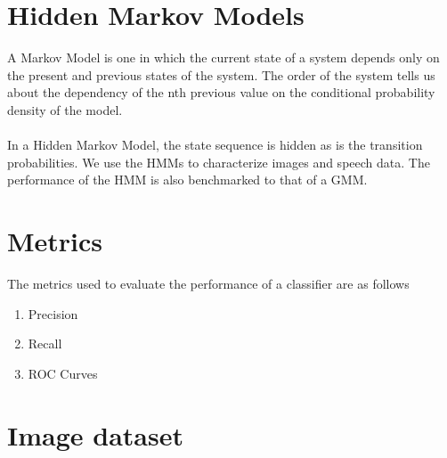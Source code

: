 \documentclass[11pt,a4paper]{article}
\begin{document}
\section{Hidden Markov Models}
A Markov Model is one in which the current state of a system depends only on the present and previous states of the system. The order of the system tells us about the dependency of the nth previous value on the conditional probability density of the model. \\ \\

In a Hidden Markov Model, the state sequence is hidden as is the transition probabilities. We use the HMMs to characterize images and speech data. The performance of the HMM is also benchmarked to that of a GMM.

\section{Metrics}
The metrics used to evaluate the performance of a classifier are as follows
\begin{enumerate}
\item Precision
\item Recall
\item ROC Curves
\end{enumerate}
\newpage
\section{Image dataset}
\end{document}
